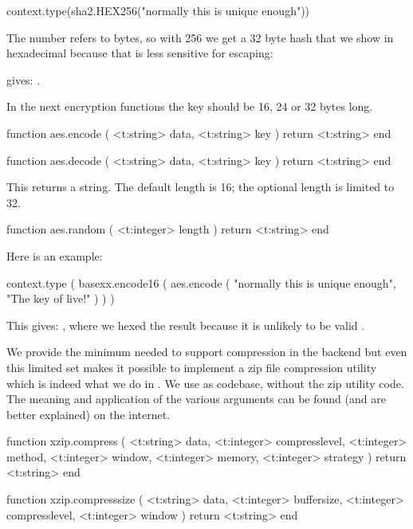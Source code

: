 \startbuffer
\startluacode
context.type(sha2.HEX256("normally this is unique enough"))
\stopluacode
\stopbuffer

The number refers to bytes, so with 256 we get a 32 byte hash that we show in
hexadecimal because that is less sensitive for escaping:

\typebuffer

gives: \inlinebuffer.

\stopsubsection

\startsubsection[title=AES encryption]

In the next encryption functions the key should be 16, 24 or 32 bytes long.

\starttyping[option=LUA]
function aes.encode (
    <t:string> data,
    <t:string> key
)
    return <t:string>
end

function aes.decode (
    <t:string> data,
    <t:string> key
)
    return <t:string>
end
\stoptyping

This returns a string. The default length is 16; the optional length is limited
to 32.

\starttyping[option=LUA]
function aes.random ( <t:integer> length )
    return <t:string>
end
\stoptyping

Here is an example:

\startbuffer
\startluacode
context.type ( basexx.encode16 ( aes.encode (
    "normally this is unique enough",
    "The key of live!"
) ) )
\stopluacode
\stopbuffer

\typebuffer

This gives: \inlinebuffer, where we hexed the result because
it is unlikely to be valid .

\stopsubsection

\startsubsection[title=ZIP (de)compression]

We provide the minimum needed to support compression in the backend but even this
limited set makes it possible to implement a zip file compression utility which
is indeed what we do in \CONTEXT. We use  as codebase, without the
zip utility code. The meaning and application of the various arguments can be
found (and are better explained) on the internet.

\starttyping[option=LUA]
function xzip.compress (
    <t:string>  data,
    <t:integer> compresslevel,
    <t:integer> method,
    <t:integer> window,
    <t:integer> memory,
    <t:integer> strategy
)
    return <t:string>
end

function xzip.compresssize (
    <t:string>  data,
    <t:integer> buffersize,
    <t:integer> compresslevel,
    <t:integer> window
)
    return <t:string>
end

